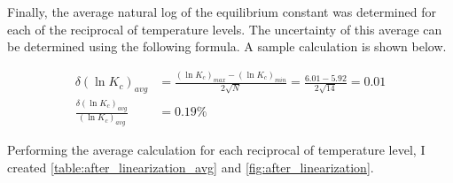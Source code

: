Finally, the average natural log of the equilibrium constant was determined for each of the reciprocal of temperature levels. The uncertainty of this average can be determined using the following formula. A sample calculation is shown below.

\begin{align}
    \delta (\ln K_c)_{avg} &= \frac{(\ln K_c)_{max} - (\ln K_c)_{min}}{2\sqrt{N}} = \frac{6.01 - 5.92}{2\sqrt{14}} = 0.01 \\
    \frac{\delta (\ln K_c)_{avg}}{(\ln K_c)_{avg}} &= 0.19\%
\end{align}

\noindent
Performing the average calculation for each reciprocal of temperature level, I created \cref{table:after_linearization_avg} and \cref{fig:after_linearization}.

